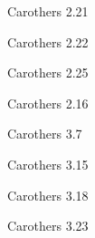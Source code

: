 \documentclass[minion]{homework641}
\begin{document}
\begin{aproblems}

\hproblem Carothers 2.21

\hproblem Carothers 2.22

\hproblem Carothers 2.25

\hproblem Carothers 2.16

\hproblem Carothers 3.7

\hproblem Carothers 3.15

\hproblem Carothers 3.18

\hproblem Carothers 3.23

\end{aproblems}
\end{document}
